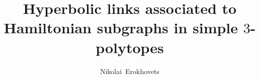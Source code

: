 \documentclass[12pt]{amsart}
\theoremstyle{definition}
\theoremstyle{remark}
\begin{document}


\title[Hyperbolic links associated to Hamiltonian 
subgraphs in simple $3$-polytopes]{Hyperbolic links associated to Hamiltonian 
subgraphs in simple $3$-polytopes}
\author[N.Yu.~Erokhovets]{Nikolai~Erokhovets}
\address{Department of Mechanics and Mathematics, Lomonosov Moscow State University}

\def\sgn{\mathrm{sgn}\,}
\def\bideg{\mathrm{bideg}\,}
\def\tdeg{\mathrm{tdeg}\,}
\def\sdeg{\mathrm{sdeg}\,}
\def\grad{\mathrm{grad}\,}
\def\ch{\mathrm{ch}\,}
\def\sh{\mathrm{sh}\,}
\def\th{\mathrm{th}\,}

\def\mod{\mathrm{mod}\,}
\def\In{\mathrm{In}\,}
\def\Im{\mathrm{Im}\,}
\def\Ker{\mathrm{Ker}\,}
\def\Hom{\mathrm{Hom}\,}
\def\Tor{\mathrm{Tor}\,}
\def\rk{\mathrm{rk}\,}
\def\codim{\mathrm{codim}\,}

\def\ko{{\mathbf k}}
\def\sk{\mathrm{sk}\,}
\def\RC{\mathrm{RC}\,}
\def\gr{\mathrm{gr}\,}

\def\R{{\mathbb R}}
\def\C{{\mathbb C}}
\def\Z{{\mathbb Z}}
\def\A{{\mathcal A}}
\def\B{{\mathcal B}}
\def\K{{\mathcal K}}
\def\M{{\mathcal M}}
\def\N{{\mathcal N}}
\def\E{{\mathcal E}}
\def\G{{\mathcal G}}
\def\D{{\mathcal D}}
\def\F{{\mathcal F}}
\def\L{{\mathcal L}}
\def\V{{\mathcal V}}
\def\H{{\mathcal H}}




\end{document}
